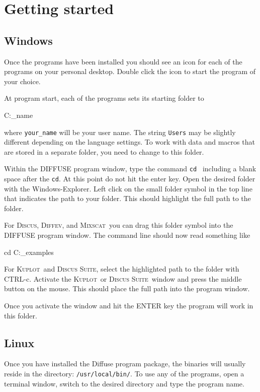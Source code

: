 \documentclass[11pt]{report}
\newcommand{\discus}{\textsc{Discus}}
\newcommand{\diffev}{\textsc{Diffev}}
\newcommand{\Kuplot}{\textsc{Kuplot\ }}
\newcommand{\Mixscat}{\textsc{Mixscat\ }}
\newcommand{\Suite}{\textsc{Discus Suite\ }}
\newcommand{\suite}{\textsc{Discus Suite}}
\begin{document}
\section{Getting started} \label{start}

\subsection{Windows} \label{start-win}

Once the programs have been installed you should see an icon for each of 
the programs on your personal desktop. Double click the icon to start
the program of your choice.

At program start, each of the programs sets its starting folder to\\
\begin{MacVerbatim}
   C:\Users\your_name
\end{MacVerbatim}
where {\tt your\_name} will be your user name. The string {\tt Users}
may be slightly different depending on the language settings.
To work with data and macros that are stored in a separate folder, 
you need to change to this folder.

Within the DIFFUSE program window, type the command {\tt cd } including a
blank space after the {\tt cd}. At this point do not hit the enter key.
Open the desired folder with the Windows-Explorer. Left click on the 
small folder symbol in the top line that indicates the path to your
folder. This should highlight the full path to the folder. 

For \discus, \diffev, and \Mixscat you can drag this folder symbol into the
DIFFUSE program window. The command line should now read something like
\begin{MacVerbatim}
   cd C:\Users\Neder\Documents\DISCUS_examples
\end{MacVerbatim}

For \Kuplot and \suite,  select the highlighted path to the folder
with CTRL-c. Activate the \Kuplot or \Suite window and press the 
middle button on the mouse. This should place the full path into the
program window. 

Once you activate the window and hit the ENTER key the program will 
work in this folder.

\subsection{Linux} \label{start-linux}

Once you have installed the Diffuse program package, the binaries will
usually reside in the directory: {\tt /usr/local/bin/}. 
To use any of the programs, open a terminal window, switch to the
desired directory and type the program name. 
\end{document}

